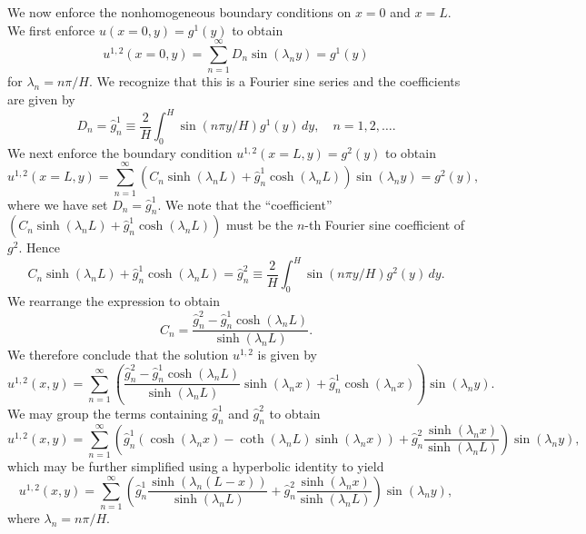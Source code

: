 We now enforce the nonhomogeneous boundary conditions on $x = 0$ and $x = L$. We first enforce $u(x = 0, y) = g^1(y)$ to obtain
\[u^{1,2}(x = 0, y) = \sum_{n=1}^{\infty} D_n\sin(\lambda_ny) = g^1(y)\]
for $\lambda_n = n\pi/H$. We recognize that this is a Fourier sine series and the coefficients are given by
\begin{equation*}
    D_n = \hat{g}_n^1 \equiv \frac{2}{H} \int_0^H \sin(n\pi y/H)g^1(y)\,dy, \quad n = 1, 2, \dots. \tag{10.3}
\end{equation*}
We next enforce the boundary condition $u^{1,2}(x = L, y) = g^2(y)$ to obtain
\[u^{1,2}(x = L, y) = \sum_{n=1}^{\infty} (C_n\sinh(\lambda_nL) + \hat{g}_n^1\cosh(\lambda_nL))\sin(\lambda_ny) = g^2(y),\]
where we have set $D_n = \hat{g}_n^1$. We note that the ``coefficient'' $(C_n\sinh(\lambda_nL) + \hat{g}_n^1\cosh(\lambda_nL))$ must be the $n$-th Fourier sine coefficient of $g^2$. Hence
\[C_n\sinh(\lambda_nL) + \hat{g}_n^1\cosh(\lambda_nL) = \hat{g}_n^2 \equiv \frac{2}{H} \int_0^H \sin(n\pi y/H)g^2(y)\,dy.\]
We rearrange the expression to obtain
\begin{equation*}
    C_n = \frac{\hat{g}_n^2 - \hat{g}_n^1\cosh(\lambda_nL)}{\sinh(\lambda_nL)}. \tag{10.4}
\end{equation*}
We therefore conclude that the solution $u^{1,2}$ is given by
\[u^{1,2}(x, y) = \sum_{n=1}^{\infty} \left(\frac{\hat{g}_n^2 - \hat{g}_n^1\cosh(\lambda_nL)}{\sinh(\lambda_nL)}\sinh(\lambda_nx) + \hat{g}_n^1\cosh(\lambda_nx)\right)\sin(\lambda_ny).\]
We may group the terms containing $\hat{g}_n^1$ and $\hat{g}_n^2$ to obtain
\[u^{1,2}(x, y) = \sum_{n=1}^{\infty} \left(\hat{g}_n^1(\cosh(\lambda_nx) - \coth(\lambda_nL)\sinh(\lambda_nx)) + \hat{g}_n^2\frac{\sinh(\lambda_nx)}{\sinh(\lambda_nL)}\right)\sin(\lambda_ny),\]
which may be further simplified using a hyperbolic identity to yield
\[u^{1,2}(x, y) = \sum_{n=1}^{\infty} \left(\hat{g}_n^1\frac{\sinh(\lambda_n(L - x))}{\sinh(\lambda_nL)} + \hat{g}_n^2\frac{\sinh(\lambda_nx)}{\sinh(\lambda_nL)}\right)\sin(\lambda_ny),\]
where $\lambda_n = n\pi/H$.

